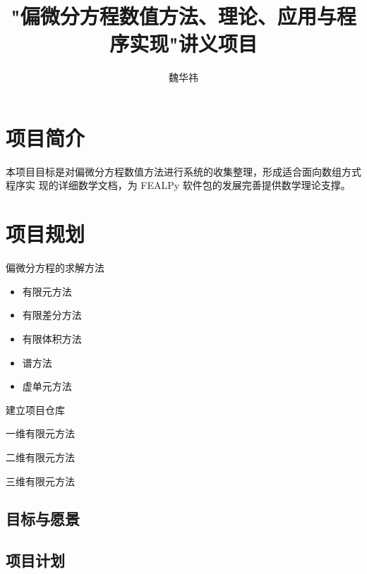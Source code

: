 \documentclass{article}
\begin{document}
\title{"偏微分方程数值方法、理论、应用与程序实现"讲义项目}
\author{魏华祎}
\maketitle
\cite{fem_2010}
\section{项目简介}

本项目目标是对偏微分方程数值方法进行系统的收集整理，形成适合面向数组方式程序实
现的详细数学文档，为 FEALPy 软件包的发展完善提供数学理论支撑。

\section{项目规划}

偏微分方程的求解方法
\begin{itemize}
    \item 有限元方法
    \item 有限差分方法
    \item 有限体积方法
    \item 谱方法
    \item 虚单元方法
\end{itemize}

\begin{todolist}
    \item[\done] 建立项目仓库
    \item 一维有限元方法 
    \item 二维有限元方法
    \item 三维有限元方法
\end{todolist}

\subsection{目标与愿景}

\subsection{项目计划}


\end{document}

